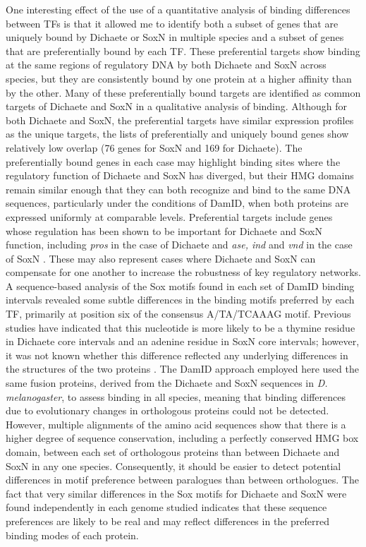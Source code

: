 One interesting effect of the use of a quantitative analysis of binding differences between TFs is that it allowed me to identify both a subset of genes that are uniquely bound by Dichaete or SoxN in multiple species and a subset of genes that are preferentially bound by each TF. These preferential targets show binding at the same regions of regulatory DNA by both Dichaete and SoxN across species, but they are consistently bound by one protein at a higher affinity than by the other. Many of these preferentially bound targets are identified as common targets of Dichaete and SoxN in a qualitative analysis of binding. Although for both Dichaete and SoxN, the preferential targets have similar expression profiles as the unique targets, the lists of preferentially and uniquely bound genes show relatively low overlap (76 genes for SoxN and 169 for Dichaete). The preferentially bound genes in each case may highlight binding sites where the regulatory function of Dichaete and SoxN has diverged, but their HMG domains remain similar enough that they can both recognize and bind to the same DNA sequences, particularly under the conditions of DamID, when both proteins are expressed uniformly at comparable levels. Preferential targets include genes whose regulation has been shown to be important for Dichaete and SoxN function, including \emph{pros} in the case of Dichaete and \emph{ase, ind} and \emph{vnd} in the case of SoxN \citep{aleksic_role_2013,ferrero_soxneuro_2014,overton_evidence_2002}. These may also represent cases where Dichaete and SoxN can compensate for one another to increase the robustness of key regulatory networks.\\

A sequence-based analysis of the Sox motifs found in each set of DamID binding intervals revealed some subtle differences in the binding motifs preferred by each TF, primarily at position six of the consensus A/TA/TCAAAG motif. Previous studies have indicated that this nucleotide is more likely to be a thymine residue in Dichaete core intervals and an adenine residue in SoxN core intervals; however, it was not known whether this difference reflected any underlying differences in the structures of the two proteins \citep{aleksic_role_2013,ferrero_soxneuro_2014}. The DamID approach employed here used the same fusion proteins, derived from the Dichaete and SoxN sequences in \emph{D. melanogaster}, to assess binding in all species, meaning that binding differences due to evolutionary changes in orthologous proteins could not be detected. However, multiple alignments of the amino acid sequences show that there is a higher degree of sequence conservation, including a perfectly conserved HMG box domain, between each set of orthologous proteins than between Dichaete and SoxN in any one species. Consequently, it should be easier to detect potential differences in motif preference between paralogues than between orthologues. The fact that very similar differences in the Sox motifs for Dichaete and SoxN were found independently in each genome studied indicates that these sequence preferences are likely to be real and may reflect differences in the preferred binding modes of each protein.\\

